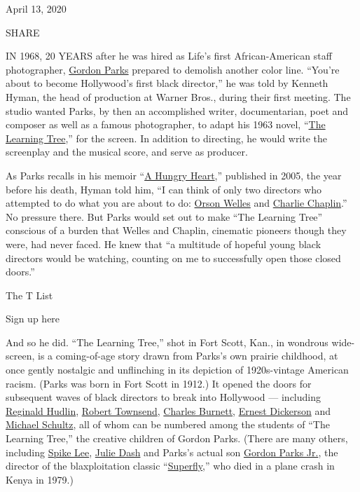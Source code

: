 April 13, 2020

SHARE

IN 1968, 20 YEARS after he was hired as Life's first African-American
staff photographer,
\href{https://www.nytimes3xbfgragh.onion/topic/person/gordon-parks}{Gordon
Parks} prepared to demolish another color line. ``You're about to become
Hollywood's first black director,'' he was told by Kenneth Hyman, the
head of production at Warner Bros., during their first meeting. The
studio wanted Parks, by then an accomplished writer, documentarian, poet
and composer as well as a famous photographer, to adapt his 1963 novel,
``\href{https://www.nytimes3xbfgragh.onion/watching/titles/the-learning-tree}{The
Learning Tree},'' for the screen. In addition to directing, he would
write the screenplay and the musical score, and serve as producer.

As Parks recalls in his memoir
``\href{https://www.simonandschuster.com/books/A-Hungry-Heart/Gordon-Parks/9780743269032}{A
Hungry Heart},'' published in 2005, the year before his death, Hyman
told him, ``I can think of only two directors who attempted to do what
you are about to do:
\href{https://www.nytimes3xbfgragh.onion/1985/10/11/arts/orson-welles-is-dead-at-70-innovator-of-film-and-stage.html}{Orson
Welles} and
\href{https://www.nytimes3xbfgragh.onion/topic/person/charles-chaplin}{Charlie
Chaplin}.'' No pressure there. But Parks would set out to make ``The
Learning Tree'' conscious of a burden that Welles and Chaplin, cinematic
pioneers though they were, had never faced. He knew that ``a multitude
of hopeful young black directors would be watching, counting on me to
successfully open those closed doors.''

The T List \textbar{}

Sign up here

And so he did. ``The Learning Tree,'' shot in Fort Scott, Kan., in
wondrous wide-screen, is a coming-of-age story drawn from Parks's own
prairie childhood, at once gently nostalgic and unflinching in its
depiction of 1920s-vintage American racism. (Parks was born in Fort
Scott in 1912.) It opened the doors for subsequent waves of black
directors to break into Hollywood --- including
\href{https://www.imdb.com/name/nm0399737/}{Reginald Hudlin},
\href{https://www.imdb.com/name/nm0870186/}{Robert Townsend},
\href{https://www.nytimes3xbfgragh.onion/2017/09/06/business/media/burnett-sutherland-honorary-oscars.html}{Charles
Burnett}, \href{https://www.imdb.com/name/nm0225416/}{Ernest Dickerson}
and \href{https://www.imdb.com/name/nm0776317/}{Michael Schultz}, all of
whom can be numbered among the students of ``The Learning Tree,'' the
creative children of Gordon Parks. (There are many others, including
\href{https://www.nytimes3xbfgragh.onion/topic/person/spike-lee}{Spike
Lee},
\href{https://www.nytimes3xbfgragh.onion/interactive/2020/04/13/t-magazine/daughters-of-the-dust.html}{Julie
Dash} and Parks's actual son
\href{https://www.imdb.com/name/nm0662899/}{Gordon Parks Jr.}, the
director of the blaxploitation classic
``\href{https://www.nytimes3xbfgragh.onion/2018/06/18/watching/blaxpoitation-films-brown-sugar.html}{Superfly},''
who died in a plane crash in Kenya in 1979.)

